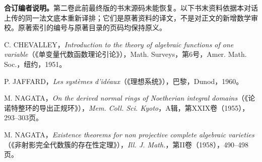 \noindent\textbf{合订编者说明。}第二卷此前最终版的书末源码未能恢复。以下书末资料依据本对话上传的同一法文底本重新译排；它们是原著资料的译文，不是对正文的新增数学审校。原著索引的编号与原著目录的页码均保持原义。
\begin{description}[leftmargin=3em,style=nextline]
\item[{[23]}] C. CHEVALLEY，\textit{Introduction to the theory of algebraic functions of one variable}（《单变量代数函数理论引论》），Math. Surveys，第6号，Amer. Math. Soc.，纽约，1951。
\item[{[24]}] P. JAFFARD，\textit{Les systèmes d'idéaux}（《理想系统》），巴黎，Dunod，1960。
\item[{[25]}] M. NAGATA，\textit{On the derived normal rings of Noetherian integral domains}（《论诺特整环的导出正规环》），\textit{Mem. Coll. Sci. Kyoto}，A辑，第XXIX卷（1955），293--303页。
\item[{[26]}] M. NAGATA，\textit{Existence theorems for non projective complete algebraic varieties}（《非射影完全代数簇的存在性定理》），\textit{Ill. J. Math.}，第II卷（1958），490--498页。
\end{description}


